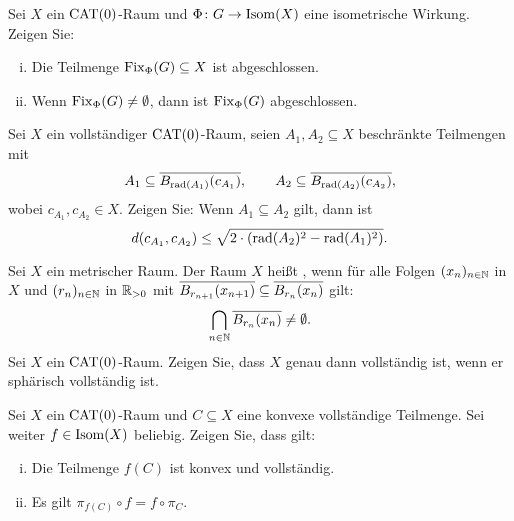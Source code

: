 	\begin{aufgabe}
	\label{aufg:2.2}	
		Sei $X$ ein $\operatorname{CAT(0)}$-Raum und $\Phi\colon G \rightarrow \operatorname{Isom}(X)$ eine isometrische Wirkung.
		Zeigen Sie:
		\begin{enumerate}[(i)]
			\item Die Teilmenge $\operatorname{Fix}_\Phi(G) \subseteq X$ ist abgeschlossen.
			\item Wenn $\operatorname{Fix}_\Phi(G) \neq \emptyset$, dann ist $\operatorname{Fix}_\Phi(G)$ abgeschlossen.
		\end{enumerate}
	\end{aufgabe}
	
	\begin{aufgabe}
	\label{aufg:2.3}	
		Sei $X$ ein vollständiger $\operatorname{CAT(0)}$-Raum, seien $A_1,A_2 \subseteq X$ beschränkte Teilmengen mit
		\[
			A_1 \subseteq \overline{B_{\operatorname{rad}(A_1)}(c_{A_1})}, \qquad A_2 \subseteq \overline{B_{\operatorname{rad}(A_2)}(c_{A_2})},
		\]
		wobei $c_{A_1}, c_{A_2} \in X$.
		Zeigen Sie: Wenn $A_1 \subseteq A_2$ gilt, dann ist
		\[
			d(c_{A_1},c_{A_2}) \leq \sqrt{2 \cdot (\operatorname{rad}(A_2)^2 - \operatorname{rad}(A_1)^2)}.
		\]
	\end{aufgabe}
	
	\begin{aufgabe}
		\label{aufg:2.4}	
		Sei $X$ ein metrischer Raum.
		Der Raum $X$ heißt , wenn für alle Folgen $(x_n)_{n \in \mathbb{N}}$ in $X$ und $(r_n)_{n \in \mathbb{N}}$ in $\mathbb{R}_{>0}$ mit $\overline{B_{r_{n+1}}(x_{n+1})} \subseteq \overline{B_{r_n}(x_n)}$ gilt:
		\[
			\bigcap_{n \in \mathbb{N}} \overline{B_{r_n}(x_n)} \neq \emptyset.
		\]
		Sei $X$ ein $\operatorname{CAT(0)}$-Raum.
		Zeigen Sie, dass $X$ genau dann vollständig ist, wenn er sphärisch vollständig ist.
	\end{aufgabe}
	
	\begin{aufgabe}
		\label{aufg:3.1}	
		Sei $X$ ein $\operatorname{CAT(0)}$-Raum und $C \subseteq X$ eine konvexe vollständige Teilmenge.
		Sei weiter $f \in \operatorname{Isom}(X)$ beliebig.
		Zeigen Sie, dass gilt:
		\begin{enumerate}[(i)]
			\item Die Teilmenge $f(C)$ ist konvex und vollständig.
			\item Es gilt $\pi_{f(C)} \circ f = f \circ \pi_C$.
		\end{enumerate}
	\end{aufgabe}

